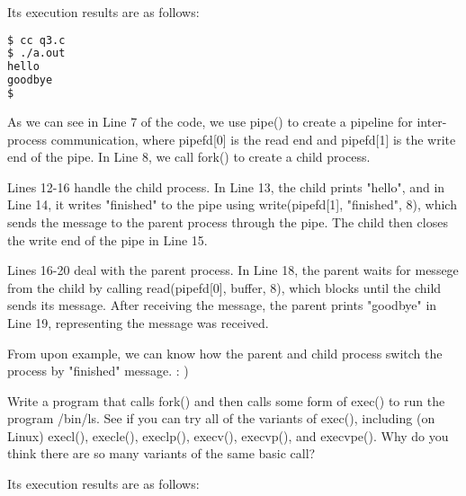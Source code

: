 \documentclass[10pt, answers]{exam}
\begin{document}
\begin{questions}
\begin{solution}
Its execution results are as follows:

\begin{lstlisting}[language=bash]
$ cc q3.c
$ ./a.out
hello
goodbye
$
\end{lstlisting}

As we can see in Line 7 of the code, we use pipe() to create a pipeline for inter-process communication, where pipefd[0] is the read end and pipefd[1] is the write end of the pipe. In Line 8, we call fork() to create a child process.

Lines 12-16 handle the child process. In Line 13, the child prints "hello", and in Line 14, it writes "finished" to the pipe using write(pipefd[1], "finished", 8), which sends the message to the parent process through the pipe. The child then closes the write end of the pipe in Line 15.

Lines 16-20 deal with the parent process. In Line 18, the parent waits for messege from the child by calling read(pipefd[0], buffer, 8), which blocks until the child sends its message. After receiving the message, the parent prints "goodbye" in Line 19, representing the message was received.

From upon example, we can know how the parent and child process switch the process by "finished" message. : )~

\end{solution}

\question
Write a program that calls fork() and then calls some form of exec() to run the program /bin/ls. See if you can try all of the variants of exec(), including (on Linux) execl(), execle(), execlp(), execv(), execvp(), and execvpe(). Why do you think there are so many variants of the same basic call?

\begin{solution}



Its execution results are as follows:


\end{solution}
\end{questions}
\end{document}
